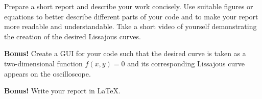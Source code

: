\documentclass[11pt]{article}
\begin{document}
\begin{question}
\begin{subquestion}{Prepare a short report and describe your work concisely. Use suitable figures or equations to  better describe different parts of your code and to make your report more readable and understandable. Take a short video of yourself demonstrating the creation of the desired Lissajous curves. 
} 
\answer{}
\end{subquestion}


\begin{subquestion}{\textbf{Bonus!} Create a GUI for your code such that the desired curve is taken as a two-dimensional function $f(x,y)=0$ and its corresponding Lissajous curve appears on the oscilloscope.
} 
\answer{}
\end{subquestion}

\begin{subquestion}{\textbf{Bonus!} Write your report in \LaTeX.
} 
\end{subquestion}

\end{question}
\end{document}

